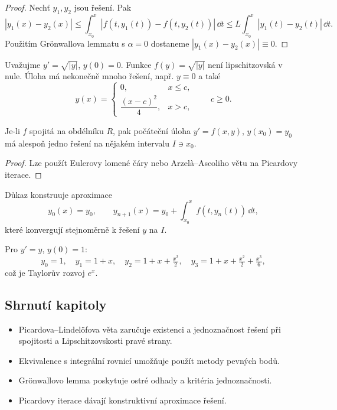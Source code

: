 \begin{proof}
Nechť $y_1,y_2$ jsou řešení. Pak
\[
|y_1(x)-y_2(x)| \le \int_{x_0}^{x} |f(t,y_1(t))-f(t,y_2(t))|\,\dd t 
\le L\int_{x_0}^{x} |y_1(t)-y_2(t)|\,\dd t.
\]
Použitím Gr\"onwallova lemmatu s $\alpha=0$ dostaneme $|y_1(x)-y_2(x)|\equiv0$.
\end{proof}

\begin{example}
\label{ex:poruseni-lipschitz}
Uvažujme $y'=\sqrt{|y|}$, $y(0)=0$. Funkce $f(y)=\sqrt{|y|}$ není lipschitzovská v nule. Úloha má nekonečně mnoho řešení, např. $y\equiv0$ a také
\[
y(x)=
\begin{cases}
0, & x\le c,\\[2pt]
\dfrac{(x-c)^2}{4}, & x>c,
\end{cases}\qquad c\ge0.
\]
\end{example}

\begin{theorem}
\label{vet:peano}
Je-li $f$ spojitá na obdélníku $R$, pak počáteční úloha $y'=f(x,y)$, $y(x_0)=y_0$ má alespoň jedno řešení na nějakém intervalu $I\ni x_0$.
\end{theorem}

\begin{proof}
Lze použít Eulerovy lomené čáry nebo Arzel\`a–Ascoliho větu na Picardovy iterace.
\end{proof}

\begin{remark}
\label{rem:picard-iterace}
Důkaz konstruuje aproximace
\[
y_0(x)=y_0,\qquad y_{n+1}(x)=y_0+\int_{x_0}^{x} f(t,y_n(t))\,\dd t,
\]
které konvergují stejnoměrně k řešení $y$ na $I$.
\end{remark}

\begin{example}
\label{ex:picard-iterace-priklad}
Pro $y'=y$, $y(0)=1$:
\[
y_0=1,\quad y_1=1+x,\quad y_2=1+x+\tfrac{x^2}{2},\quad y_3=1+x+\tfrac{x^2}{2}+\tfrac{x^3}{6},
\]
což je Taylorův rozvoj $e^x$.
\end{example}

\spc

\subsection*{Shrnutí kapitoly}
\begin{itemize}
\item Picardova–Lindel\"ofova věta zaručuje existenci a jednoznačnost řešení při spojitosti a Lipschitzovskosti pravé strany.
\item Ekvivalence s integrální rovnicí umožňuje použít metody pevných bodů.
\item Gr\"onwallovo lemma poskytuje ostré odhady a kritéria jednoznačnosti.
\item Picardovy iterace dávají konstruktivní aproximace řešení.
\end{itemize}


